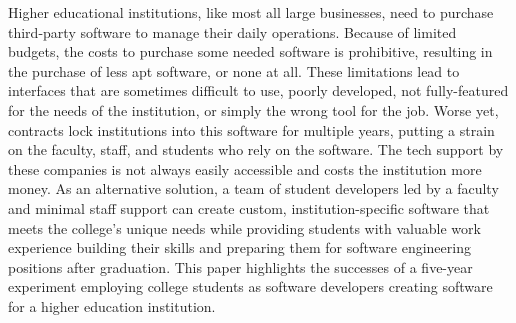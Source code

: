 Higher educational institutions, like most all large businesses, need to purchase third-party software to manage their daily operations. Because of limited budgets, the costs to purchase some needed software is prohibitive, resulting in the purchase of less apt software, or none at all. These limitations lead to interfaces that are sometimes difficult to use, poorly developed, not fully-featured for the needs of the institution, or simply the wrong tool for the job. Worse yet, contracts lock institutions into this software for multiple years, putting a strain on the faculty, staff, and students who rely on the software. The tech support by these companies is not always easily accessible and costs the institution more money. As an alternative solution, a team of student developers led by a faculty and minimal staff support can create custom, institution-specific software that meets the college's unique needs while providing students with valuable work experience building their skills and preparing them for software engineering positions after graduation. This paper highlights the successes of a five-year experiment employing college students as software developers creating software for a higher education institution.

